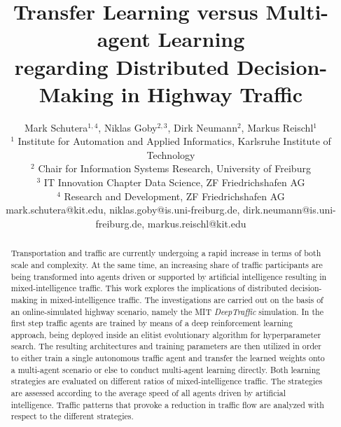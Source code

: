 \documentclass{article}
\title{Transfer Learning versus Multi-agent Learning \\
	regarding Distributed Decision-Making in Highway Traffic}
\author{
Mark Schutera$^{1, 4}$, 
Niklas Goby$^{2, 3}$, 
Dirk Neumann$^{2}$, 
Markus Reischl$^{1}$
\\ 
$^1$ Institute for Automation and Applied Informatics, Karlsruhe Institute of Technology \\
$^2$ Chair for Information Systems Research, University of Freiburg\\
$^3$ IT Innovation Chapter Data Science, ZF Friedrichshafen AG\\
$^4$ Research and Development, ZF Friedrichshafen AG\\
%
mark.schutera@kit.edu,
niklas.goby@is.uni-freiburg.de,
dirk.neumann@is.uni-freiburg.de,
markus.reischl@kit.edu
}
\begin{document}
\maketitle

\begin{abstract}
  Transportation and traffic are currently undergoing a rapid increase in terms of both scale and complexity. At the same time, an increasing share of traffic participants are being transformed into agents driven or supported by artificial intelligence resulting in mixed-intelligence traffic. This work explores the implications of distributed decision-making in mixed-intelligence traffic. The investigations are carried out on the basis of an online-simulated highway scenario, namely the MIT \emph{DeepTraffic} simulation. In the first step traffic agents are trained by means of a deep reinforcement learning approach, being deployed inside an elitist evolutionary algorithm for hyperparameter search. The resulting architectures and training parameters are then utilized in order to either train a single autonomous traffic agent and transfer the learned weights onto a multi-agent scenario or else to conduct multi-agent learning directly. Both learning strategies are evaluated on different ratios of mixed-intelligence traffic. The strategies are assessed according to the average speed of all agents driven by artificial intelligence. Traffic patterns that provoke a reduction in traffic flow are analyzed with respect to the different strategies.
\end{abstract}
\end{document}

